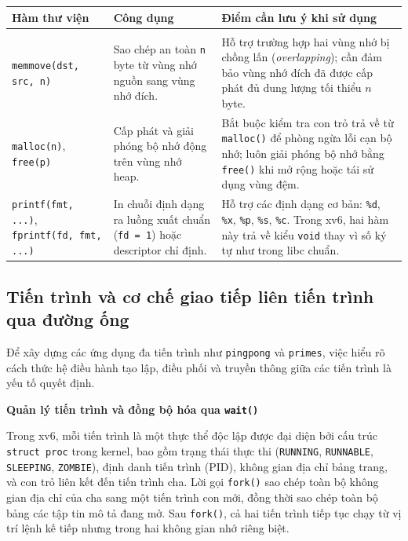 \documentclass[12pt,a4paper]{article}
\begin{document}
\begin{minipage}{\textwidth}
\small
\renewcommand{\arraystretch}{1.2}
\setlength{\parskip}{0pt}
\begin{tabularx}{\textwidth}{@{}>{\raggedright\arraybackslash}p{}
  >{\raggedright\arraybackslash}p{}
  >{\raggedright\arraybackslash}X@{}}
\toprule
\rowcolor{tableheader}
\textbf{Hàm thư viện} & \textbf{Công dụng} & \textbf{Điểm cần lưu ý khi sử dụng} \\
\midrule
\multicolumn{3}{@{}l@{}}{\textbf{Cấp phát bộ nhớ và xuất dữ liệu định dạng}} \\
\midrule
\texttt{memmove(dst, src, n)} &
Sao chép an toàn \texttt{n} byte từ vùng nhớ nguồn sang vùng nhớ đích. &
Hỗ trợ trường hợp hai vùng nhớ bị chồng lấn (\textit{overlapping}); cần đảm bảo vùng nhớ đích đã được cấp phát đủ dung lượng tối thiểu $n$ byte. \\
\texttt{malloc(n)}, \texttt{free(p)} &
Cấp phát và giải phóng bộ nhớ động trên vùng nhớ heap. &
Bắt buộc kiểm tra con trỏ trả về từ \texttt{malloc()} để phòng ngừa lỗi cạn bộ nhớ; luôn giải phóng bộ nhớ bằng \texttt{free()} khi mở rộng hoặc tái sử dụng vùng đệm. \\
\texttt{printf(fmt, ...)}, \texttt{fprintf(fd, fmt, ...)} &
In chuỗi định dạng ra luồng xuất chuẩn (\texttt{fd = 1}) hoặc descriptor chỉ định. &
Hỗ trợ các định dạng cơ bản: \texttt{\%d}, \texttt{\%x}, \texttt{\%p}, \texttt{\%s}, \texttt{\%c}. Trong xv6, hai hàm này trả về kiểu \texttt{void} thay vì số ký tự như trong libc chuẩn. \\
\bottomrule
\end{tabularx}
\end{minipage}

\newpage

\subsection{Tiến trình và cơ chế giao tiếp liên tiến trình qua đường ống}

Để xây dựng các ứng dụng đa tiến trình như \texttt{pingpong} và \texttt{primes}, việc hiểu rõ cách thức hệ điều hành tạo lập, điều phối và truyền thông giữa các tiến trình là yếu tố quyết định.

\textbf{Quản lý tiến trình và đồng bộ hóa qua \texttt{wait()}}

Trong xv6, mỗi tiến trình là một thực thể độc lập được đại diện bởi cấu trúc \texttt{struct proc} trong kernel, bao gồm trạng thái thực thi (\texttt{RUNNING}, \texttt{RUNNABLE}, \texttt{SLEEPING}, \texttt{ZOMBIE}), định danh tiến trình (PID), không gian địa chỉ bảng trang, và con trỏ liên kết đến tiến trình cha. Lời gọi \texttt{fork()} sao chép toàn bộ không gian địa chỉ của cha sang một tiến trình con mới, đồng thời sao chép toàn bộ bảng các tập tin mô tả đang mở. Sau \texttt{fork()}, cả hai tiến trình tiếp tục chạy từ vị trí lệnh kế tiếp nhưng trong hai không gian nhớ riêng biệt.
\end{document}
